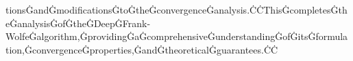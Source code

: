 tionsĠandĠmodificationsĠtoĠtheĠconvergenceĠanalysis.ĊĊThisĠcompletesĠtheĠanalysisĠofĠtheĠDeepĠFrank-WolfeĠalgorithm,ĠprovidingĠaĠcomprehensiveĠunderstandingĠofĠitsĠformulation,ĠconvergenceĠproperties,ĠandĠtheoreticalĠguarantees.ĊĊ%